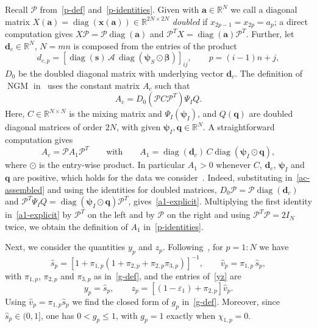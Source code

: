 \documentclass[11pt]{article}
\theoremstyle{plain}
\theoremstyle{definition}
\theoremstyle{remark}
\numberwithin{equation}{section}
\numberwithin{figure}{section}
\numberwithin{table}{section}
\begin{document}
Recall $\mathscr{P}$ from~\eqref{p-def} and~\eqref{p-identities}. 
Given with $\bm{a}\in \mathbb{R}^{N}$ we call a diagonal matrix
$X(\bm a)=\operatorname{diag}\left(\bm x(\bm a)\right)
\in\mathbb{R}^{2N\times 2N}$ 
\emph{doubled} if $x_{2p-1}=x_{2p}=a_p$; 
a direct computation gives $X\mathscr{P}=\mathscr{P}\operatorname{diag}(\bm a)$ and
$\mathscr{P}^TX=\operatorname{diag}(\bm a)\mathscr{P}^T$. Further, let $\bm d_c\in\mathbb{R}^{N}$, $N=mn$ is composed from the entries of the product 
\begin{equation}
d_{c,p}=\left\lbrack\operatorname{diag}(\bm s)\,\mathscr{A}\,
\operatorname{diag}\left(\bm\psi_S\odot\bm\beta\right)\right\rbrack_{ij},
\qquad p=(i-1)n+j,
\end{equation} 
$D_0$ be the doubled diagonal matrix with underlying vector $\bm d_c$. 
The definition of $\operatorname{NGM}$ in~\cite{JZh} uses the constant matrix $A_c$ such that 
\begin{equation}\label{ac-assembled}
A_c=D_0\left(\mathscr{P}C\mathscr{P}^T\right)\Psi_IQ.
\end{equation}
Here, $C\in\mathbb{R}^{N\times N}$ is the mixing matrix and $\Psi_I(\bm\psi_I)$, and $Q(\bm q)$ 
are doubled diagonal matrices of order $2N$, with given
$\bm\psi_I,\bm q\in\mathbb{R}^{N}$.
A straightforward computation gives
\begin{equation}\label{a1-explicit}
A_c=\mathscr{P}A_1\mathscr{P}^T\qquad\mbox{with}\qquad
A_1=\operatorname{diag}(\bm d_c)\,C\operatorname{diag}\left(\bm\psi_I\odot\bm q\right),
\end{equation}
where $\odot$ is the entry-wise product. In particular $A_1>0$ whenever $C$,
$\bm d_c$, $\bm\psi_I$ and $\bm q$ are positive, which holds for the data we consider~\cite{JZh}. Indeed,
substituting in~\eqref{ac-assembled} and using the identities for doubled
matrices, $D_0\mathscr{P}=\mathscr{P}\operatorname{diag}(\bm d_c)$ and
$\mathscr{P}^T\Psi_IQ=\operatorname{diag}\left(\bm\psi_I\odot\bm q\right)\mathscr{P}^T$,
gives~\eqref{a1-explicit}. Multiplying the first identity
in~\eqref{a1-explicit} by $\mathscr{P}^T$ on the left and by $\mathscr{P}$ on the
right and using $\mathscr{P}^T\mathscr{P}=2I_N$ twice, we obtain the definition
of $A_1$ in~\eqref{p-identities}.


Next, we consider the quantities $y_p$ and $z_p$. Following~\cite{JZh}, for $p=1:N$ we have
\begin{equation}\label{fractions}
\widehat s_p=\left\lbrack
1+\pi_{1,p}\left(1+\pi_{2,p}+\pi_{2,p}\pi_{3,p}\right)\right\rbrack^{-1},
\qquad \widehat v_p=\pi_{1,p}\,\widehat s_p,
\end{equation}
with $\pi_{1,p}$, $\pi_{2,p}$ and $\pi_{3,p}$ as in~\eqref{g-def}, and the
entries of~\eqref{yz} are
\begin{equation}\label{yz-def}
y_p=\widehat s_p,\qquad
z_p=\left\lbrack(1-\varepsilon_1)+\pi_{2,p}\right\rbrack\widehat v_p .
\end{equation}
Using $\widehat v_p=\pi_{1,p}\widehat s_p$ we find the 
closed form of 
$g_p$ in~\eqref{g-def}. Moreover, since $\widehat s_p\in(0,1]$, one has $0<g_p\le 1$, with $g_p=1$ exactly when $\chi_{1,p}=0$.
\end{document}
